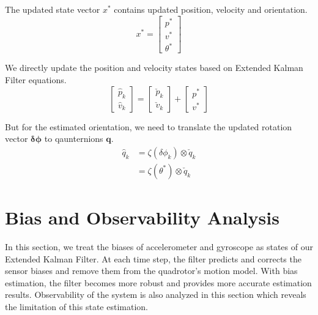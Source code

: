 \documentclass[letterpaper, 10 pt, conference]{ieeeconf}  %
\begin{document}
The updated state vector $x^{\ast}$ contains updated position, velocity and orientation.
\begin{equation}
\renewcommand\arraystretch{1.3}
x^{\ast}=\begin{bmatrix}
p^{\ast}  \\
v^{\ast}  \\
\theta^{\ast}
\end{bmatrix}
\end{equation}

We directly update the position and velocity states based on Extended Kalman Filter equations.
\begin{equation}
\renewcommand\arraystretch{1.3}
\begin{bmatrix}
\hat{p}_k \\
\hat{v}_k
\end{bmatrix} =\begin{bmatrix}
\check{p}_k \\
\check{v}_k
\end{bmatrix} + \begin{bmatrix}
p^{\ast}  \\
v^{\ast}
\end{bmatrix}
\end{equation}

But for the estimated orientation, we need to translate the updated rotation vector $\bm{\delta \phi}$ to qaunternions $\bm{q}$.
\begin{equation}
\renewcommand\arraystretch{1.3}
\begin{split}
\hat{q}_k &= \zeta(\delta \phi_k)\otimes \check{q}_k    \\
		  &= \zeta(\theta^{\ast})\otimes \check{q}_k  
\end{split}
\end{equation}

\section{Bias and Observability Analysis}
In this section, we treat the biases of accelerometer and gyroscope as states of our Extended Kalman Filter. At each time step, the filter predicts and corrects the sensor biases and remove them from the quadrotor's motion model. With bias estimation, the filter becomes more robust and provides more accurate estimation results. Observability of the system is also analyzed in this section which reveals the limitation of this state estimation.  
\end{document}
